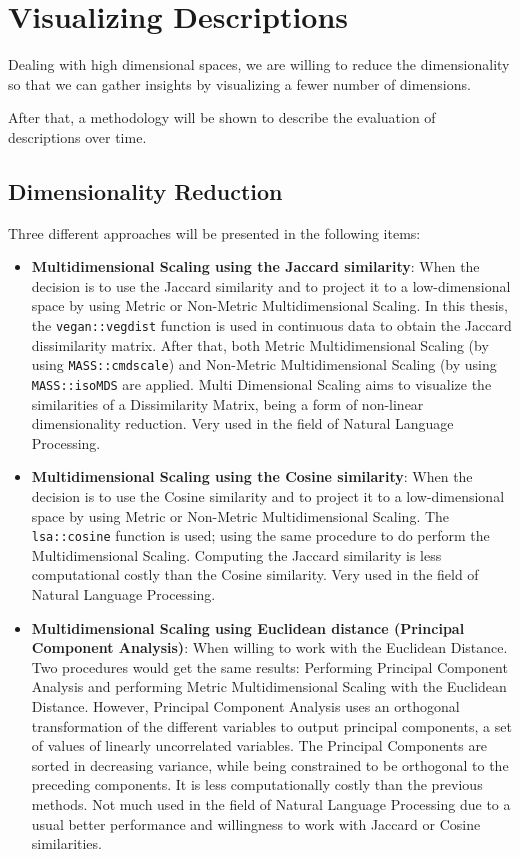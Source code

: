 \section{Visualizing Descriptions}
Dealing with high dimensional spaces, we are willing to reduce the dimensionality so that we can gather insights by visualizing a fewer number of dimensions. \par
After that, a methodology will be shown to describe the evaluation of descriptions over time.

\subsection{Dimensionality Reduction}
Three different approaches will be presented in the following items:
\begin{itemize}
\item \textbf{Multidimensional Scaling using the Jaccard similarity}: When the decision is to use the Jaccard similarity and to project it to a low-dimensional space by using Metric or Non-Metric Multidimensional Scaling. In this thesis, the \texttt{vegan::vegdist} function is used in continuous data to obtain the Jaccard dissimilarity matrix. After that, both Metric Multidimensional Scaling (by using \texttt{MASS::cmdscale}) and Non-Metric Multidimensional Scaling (by using \texttt{MASS::isoMDS} are applied. Multi Dimensional Scaling aims to visualize the similarities of a Dissimilarity Matrix, being a form of non-linear dimensionality reduction. Very used in the field of Natural Language Processing.
\item \textbf{Multidimensional Scaling using the Cosine similarity}: When the decision is to use the Cosine similarity and to project it to a low-dimensional space by using Metric or Non-Metric Multidimensional Scaling. The \texttt{lsa::cosine} function is used; using the same procedure to do perform the Multidimensional Scaling. Computing the Jaccard similarity is less computational costly than the Cosine similarity. Very used in the field of Natural Language Processing.
\item \textbf{Multidimensional Scaling using Euclidean distance (Principal Component Analysis)}: When willing to work with the Euclidean Distance. Two procedures would get the same results: Performing Principal Component Analysis and performing Metric Multidimensional Scaling with the Euclidean Distance. However, Principal Component Analysis uses an orthogonal transformation of the different variables to output principal components, a set of values of linearly uncorrelated variables. The Principal Components are sorted in decreasing variance, while being constrained to be orthogonal to the preceding components. It is less computationally costly than the previous methods. Not much used in the field of Natural Language Processing due to a usual better performance and willingness to work with Jaccard or Cosine similarities.
\end{itemize}

